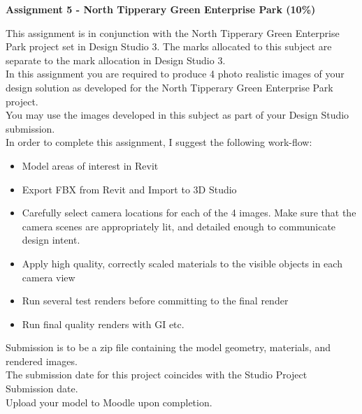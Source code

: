 
	
\begin{flushleft}
\Large\textbf{Assignment 5 - North Tipperary Green Enterprise Park (10\%)}\\
\end{flushleft}

This assignment is in conjunction with the North Tipperary Green Enterprise Park project set in Design Studio 3.  The marks allocated to this subject are separate to the mark allocation in Design Studio 3.\\

In this assignment you are required to produce 4 photo realistic images of your design solution as developed for the North Tipperary Green Enterprise Park project.\\

You may use the images developed in this subject as part of your Design Studio submission.\\

In order to complete this assignment, I suggest the following work-flow:

\begin{itemize}
	\item Model areas of interest in Revit
	\item Export FBX from Revit and Import to 3D Studio
	\item Carefully select camera locations for each of the 4 images.  Make sure that the camera scenes are appropriately lit, and detailed enough to communicate design intent.  
	\item Apply high quality, correctly scaled materials to the visible objects in each camera view
	\item Run several test renders before committing to the final render
	\item Run final quality renders with GI etc.
\end{itemize}

Submission is to be a zip file containing the model geometry, materials, and rendered images.\\

The submission date for this project coincides with the Studio Project Submission date.\\

Upload your model to Moodle upon completion.


